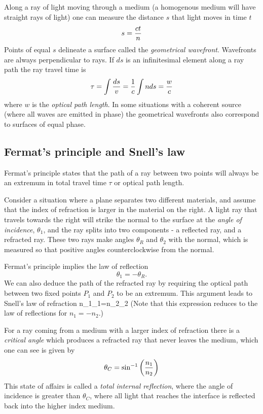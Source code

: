Along a ray of light moving through a medium (a homogenous medium will have straight rays
of light) one can measure the distance $s$ that light moves in time $t$
\[
s={ct\over n}
\]
Points of equal $s$ delineate a surface called the {\it geometrical wavefront}. Wavefronts
are always perpendicular to rays. If $ds$ is an infinitesimal element along a ray path the
ray travel time is 
\[
\tau=\int{ds\over v}={1\over c}\int nds={w\over c}
\]
where $w$ is the {\it optical path length}. In some situations with a coherent source (where
all waves are emitted in phase) the geometrical wavefronts also correspond to surfaces of
equal phase.

\subsection{Fermat's principle and Snell's law}

Fermat's principle states that the path of a ray between two points will always be an extremum
in total travel time $\tau$ or optical path length.

 Consider a situation where a plane separates
two different materials, and assume that the index of refraction is larger in the material on the
right. A light ray that travels towards the right will strike the normal to the surface at the 
{\it angle of incidence}, $\theta_1$, and the ray splits into two components - a reflected ray, 
and a refracted ray. These two rays make angles $\theta_R$ and $\theta_2$ with the normal, 
which is measured so that positive angles counterclockwise from the normal. 

Fermat's principle implies the law of reflection
\[
\theta_1=-\theta_R.
\]
We can also deduce the path of the refracted ray by requiring the optical path between two
fixed points $P_1$ and $P_2$ to be an extremum. This argument leads to Snell's law of 
refraction
\be
n_1\sin\theta_1=n_2\sin\theta_2
\label{eq:snell}
\ee
(Note that this expression reduces to the law of reflections for
$n_1=-n_2$.) 

For a ray coming
from a medium with a larger index of refraction there is a {\it critical angle} which 
produces a refracted ray that never leaves the medium, which one can see is given by 
\[
\theta_C=\sin^{-1}\left({n_1\over n_2}\right)
\]
This state of affairs is called a {\it total internal reflection}, where the angle of incidence is greater
than $\theta_C$, where all light that reaches the interface is reflected back into the higher index
medium. 

